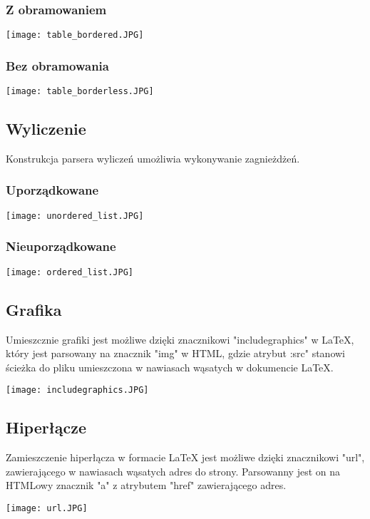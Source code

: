 \subsubsection{Z obramowaniem}

\texttt{[image: table\_bordered.JPG]}

\subsubsection{Bez obramowania}

\texttt{[image: table\_borderless.JPG]}


\subsection{Wyliczenie}

Konstrukcja parsera wyliczeń umożliwia wykonywanie zagnieżdżeń.

\subsubsection{Uporządkowane}

\texttt{[image: unordered\_list.JPG]}

\subsubsection{Nieuporządkowane}

\texttt{[image: ordered\_list.JPG]}

\subsection{Grafika}

Umieszcznie grafiki jest możliwe dzięki znacznikowi "includegraphics" w LaTeX, który jest parsowany na znacznik "img" w HTML, gdzie 
atrybut :src" stanowi ścieżka do pliku umieszczona w nawiasach wąsatych w dokumencie LaTeX.

\texttt{[image: includegraphics.JPG]}

\subsection{Hiperłącze}

Zamieszczenie hiperłącza w formacie LaTeX jest możliwe dzięki znacznikowi "url", zawierającego w nawiasach wąsatych adres do strony.
Parsowanny jest on na HTMLowy znacznik "a" z atrybutem "href" zawierającego adres.

\texttt{[image: url.JPG]}